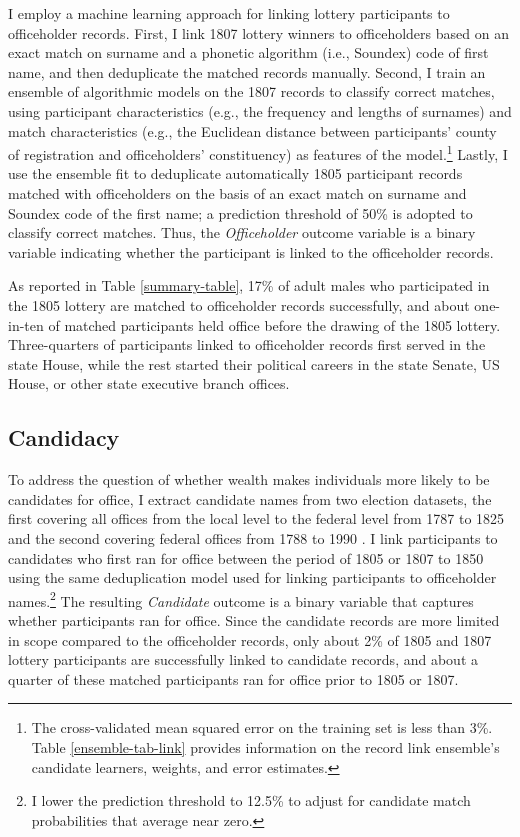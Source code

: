 I employ a machine learning approach for linking lottery participants to officeholder records. First, I link 1807 lottery winners to officeholders based on an exact match on surname and a phonetic algorithm (i.e., Soundex) code of first name, and then deduplicate the matched records manually. Second, I train an ensemble of algorithmic models on the 1807 records to classify correct matches, using participant characteristics (e.g., the frequency and lengths of surnames) and match characteristics (e.g., the Euclidean distance between participants' county of registration and officeholders' constituency) as features of the model.\footnote{The cross-validated mean squared error on the training set is less than 3\%. Table \ref{ensemble-tab-link} provides information on the record link ensemble's candidate learners, weights, and error estimates.} Lastly, I use the ensemble fit to deduplicate automatically 1805 participant records matched with officeholders on the basis of an exact match on surname and Soundex code of the first name; a prediction threshold of 50\% is adopted to classify correct matches. Thus, the \textit{Officeholder} outcome variable is a binary variable indicating whether the participant is linked to the officeholder records.

As reported in Table \ref{summary-table}, 17\% of adult males who participated in the 1805 lottery are matched to officeholder records successfully, and about one-in-ten of matched participants held office before the drawing of the 1805 lottery. Three-quarters of participants linked to officeholder records first served in the state House, while the rest started their political careers in the state Senate, US House, or other state executive branch offices.

\subsection{Candidacy}

To address the question of whether wealth makes individuals more likely to be candidates for office, I extract candidate names from two election datasets, the first covering all offices from the local level to the federal level from 1787 to 1825 \citep{lampi2012} and the second covering federal offices from 1788 to 1990 \citep{inter1984}. I link participants to candidates who first ran for office between the period of 1805 or 1807 to 1850 using the same deduplication model used for linking participants to officeholder names.\footnote{I lower the prediction threshold to 12.5\% to adjust for candidate match probabilities that average near zero.} The resulting \textit{Candidate} outcome is a binary variable that captures whether participants ran for office. Since the candidate records are more limited in scope compared to the officeholder records, only about 2\% of 1805 and 1807 lottery participants are successfully linked to candidate records, and about a quarter of these matched participants ran for office prior to 1805 or 1807.

